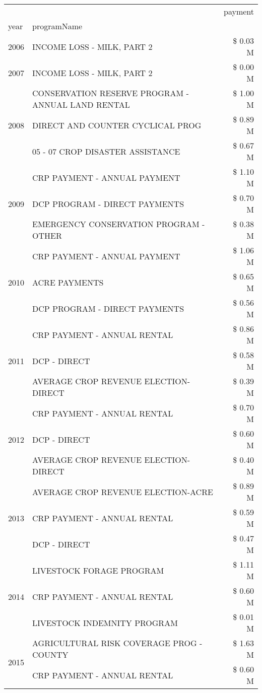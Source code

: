 \begin{tabular}{llr}
\toprule
 &  & payment \\
year & programName &  \\
\midrule
2006 & INCOME LOSS - MILK, PART 2 & \$ 0.03 M \\
\cline{1-3}
2007 & INCOME LOSS - MILK, PART 2 & \$ 0.00 M \\
\cline{1-3}
\multirow[t]{3}{*}{2008} & CONSERVATION RESERVE PROGRAM - ANNUAL LAND RENTAL & \$ 1.00 M \\
 & DIRECT AND COUNTER CYCLICAL PROG & \$ 0.89 M \\
 & 05 - 07 CROP DISASTER ASSISTANCE & \$ 0.67 M \\
\cline{1-3}
\multirow[t]{3}{*}{2009} & CRP PAYMENT - ANNUAL PAYMENT & \$ 1.10 M \\
 & DCP PROGRAM - DIRECT PAYMENTS & \$ 0.70 M \\
 & EMERGENCY CONSERVATION PROGRAM - OTHER & \$ 0.38 M \\
\cline{1-3}
\multirow[t]{3}{*}{2010} & CRP PAYMENT - ANNUAL PAYMENT & \$ 1.06 M \\
 & ACRE PAYMENTS & \$ 0.65 M \\
 & DCP PROGRAM - DIRECT PAYMENTS & \$ 0.56 M \\
\cline{1-3}
\multirow[t]{3}{*}{2011} & CRP PAYMENT - ANNUAL RENTAL & \$ 0.86 M \\
 & DCP - DIRECT & \$ 0.58 M \\
 & AVERAGE CROP REVENUE ELECTION-DIRECT & \$ 0.39 M \\
\cline{1-3}
\multirow[t]{3}{*}{2012} & CRP PAYMENT - ANNUAL RENTAL & \$ 0.70 M \\
 & DCP - DIRECT & \$ 0.60 M \\
 & AVERAGE CROP REVENUE ELECTION-DIRECT & \$ 0.40 M \\
\cline{1-3}
\multirow[t]{3}{*}{2013} & AVERAGE CROP REVENUE ELECTION-ACRE & \$ 0.89 M \\
 & CRP PAYMENT - ANNUAL RENTAL & \$ 0.59 M \\
 & DCP - DIRECT & \$ 0.47 M \\
\cline{1-3}
\multirow[t]{3}{*}{2014} & LIVESTOCK FORAGE PROGRAM & \$ 1.11 M \\
 & CRP PAYMENT - ANNUAL RENTAL & \$ 0.60 M \\
 & LIVESTOCK INDEMNITY PROGRAM & \$ 0.01 M \\
\cline{1-3}
\multirow[t]{3}{*}{2015} & AGRICULTURAL RISK COVERAGE PROG - COUNTY & \$ 1.63 M \\
 & CRP PAYMENT - ANNUAL RENTAL & \$ 0.60 M \\

\end{tabular}
